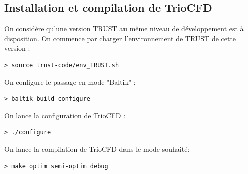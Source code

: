 \subsection{\label{subsec:install}Installation et compilation de TrioCFD}
On considère qu'une version TRUST au même niveau de développement est à disposition. On commence par charger l'environnement de TRUST de cette version :
\begin{lstlisting}
> source trust-code/env_TRUST.sh
\end{lstlisting}
On configure le passage en mode "Baltik" :
\begin{lstlisting}
> baltik_build_configure
\end{lstlisting}
On lance la configuration de TrioCFD :
\begin{lstlisting}
> ./configure
\end{lstlisting}
On lance la compilation de TrioCFD dans le mode souhaité:
\begin{lstlisting}
> make optim semi-optim debug
\end{lstlisting}

